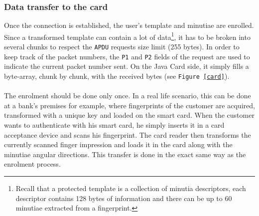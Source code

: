 \documentclass[a4paper,12pt]{article}
\begin{document}
\begin{table}[h]
\centering
{}
\caption{Command \texttt{APDU} content for the applet selection}
\label{tab:apducmd:matching}
\end{table}

\subsubsection{Data transfer to the card}
Once the connection is established, the user's template and minutiae are enrolled. Since a transformed template can contain a lot of data\footnote{Recall that a protected template is a collection of minutia descriptors, each descriptor contains 128 bytes of information and there can be up to 60 minutiae extracted from a fingerprint.}, it has to be broken into several chunks to respect the \texttt{APDU} requests size limit (255 bytes). In order to keep track of the packet numbers, the \texttt{P1} and \texttt{P2} fields of the request are used to indicate the current packet number sent. On the Java Card side, it simply fills a byte-array, chunk by chunk, with the received bytes (see \texttt{Figure \ref{card}}).
\\\\
The enrolment should be done only once. In a real life scenario, this can be done at a bank's premises for example, where fingerprints of the customer are acquired, transformed with a unique key and loaded on the smart card. When the customer wants to authenticate with his smart card, he simply inserts it in a card acceptance device and scans his fingerprint. The card reader then transforms the currently scanned finger impression and loads it in the card along with the minutiae angular directions. This transfer is done in the exact same way as the enrolment process.

\begin{table}[h]
\centering
{}
\caption{Command \texttt{APDU} content for enrolling a user's template}
\label{tab:apducmd:enroll}
\end{table}
\end{document}
